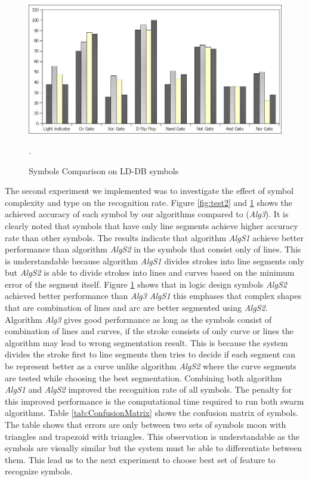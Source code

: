 \documentclass{article}
\begin{document}
\begin{figure}
	\centering
		\includegraphics[scale=0.5]{images/LDsymbols.jpg}
	\caption{Symbols Comparison on LD-DB symbols}.  %
	\label{fig:LDtest2}
\end{figure}  
The second experiment we implemented was to investigate the effect of symbol complexity and type on the recognition rate. Figure \ref{fig:test2} and \ref{fig:LDtest2} shows the achieved accuracy of each symbol by our algorithms compared to \cite{earlyprocess} (\textsl{Alg3}). It is clearly noted that symbols that have only line segments achieve higher accuracy rate than other symbols. The results indicate that algorithm \textsl{AlgS1} achieve better performance than algorithm \textsl{AlgS2} in the symbols that consist only of lines. This is understandable because algorithm \textsl{AlgS1} divides strokes into line segments only but \textsl{AlgS2} is able to divide strokes into lines and curves based on the minimum error of the segment itself. Figure \ref{fig:LDtest2} shows that in logic design symbols \textsl{AlgS2} achieved better performance than \textsl{Alg3} \textsl{AlgS1} this emphases that complex shapes that are combination of lines and arc are better segmented using \textsl{AlgS2}. Algorithm \textsl{Alg3} gives good performance as long as the symbols consist of combination of lines and curves, if the stroke consists of only curve or lines the algorithm may lead to wrong segmentation result. This is because the system divides the stroke first to line segments then tries to decide if each segment can be represent better as a curve unlike algorithm \textsl{AlgS2} where the curve segments are tested while choosing the best segmentation. Combining both algorithm \textsl{AlgS1} and \textsl{AlgS2} improved the recognition rate of all symbols. The penalty for this improved performance is the computational time required to run both swarm algorithms. Table \ref{tab:ConfusionMatrix} shows the confusion matrix of symbols. The table shows that errors are only between two sets of symbols moon with triangles and trapezoid with triangles. This observation is understandable as the symbols are visually similar but the system must be able to differentiate between them. This lead us to the next experiment to choose best set of feature to recognize symbols. 
\end{document}
